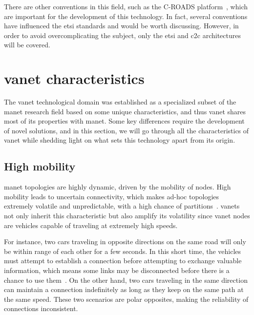 There are other conventions in this field, such as the C-ROADS platform~\cite{noauthor_platform_nodate}, which are important for the development of this technology. In fact, several conventions have influenced the \gls{etsi} standards and would be worth discussing. However, in order to avoid overcomplicating the subject, only the \gls{etsi} and \gls{c2c} architectures will be covered.




\section[VANET characteristics]{\gls{vanet} characteristics}
\label{sec:VANET_characteristics}

The \gls{vanet} technological domain was established as a specialized subset of the \gls{manet} research field based on some unique characteristics, and thus \gls{vanet} shares most of its properties with \gls{manet}. Some key differences require the development of novel solutions, and in this section, we will go through all the characteristics of \gls{vanet} while shedding light on what sets this technology apart from its origin.

\subsection{High mobility}
\label{subsec:high_mob}

\gls{manet} topologies are highly dynamic, driven by the mobility of nodes. High mobility leads to uncertain connectivity, which makes ad-hoc topologies extremely volatile and unpredictable, with a high chance of partitions~\cite{toor_vehicle_2008}. \glspl{vanet} not only inherit this characteristic but also amplify its volatility since \gls{vanet} nodes are vehicles capable of traveling at extremely high speeds. 

For instance, two cars traveling in opposite directions on the same road will only be within range of each other for a few seconds. In this short time, the vehicles must attempt to establish a connection before attempting to exchange valuable information, which means some links may be disconnected before there is a chance to use them~\cite{liang_vehicular_2015}. On the other hand, two cars traveling in the same direction can maintain a connection indefinitely as long as they keep on the same path at the same speed. These two scenarios are polar opposites, making the reliability of connections inconsistent.

